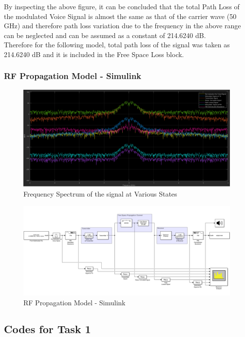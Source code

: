 \documentclass[a4paper,11pt]{article}%
\begin{document}
By inspecting the above figure, it can be concluded that the total Path Loss of the modulated Voice Signal is almost the same as that of the carrier wave (50 GHz) and therefore path loss variation due to the frequency in the above range can be neglected and can be assumed as a constant of 214.6240 dB.\\
Therefore for the following model, total path loss of the signal was taken as 214.6240 dB and it is included in the Free Space Loss block.

\subsubsection{RF Propagation Model - Simulink}

\begin{figure}[!h]
	\centering
	\includegraphics[scale = 0.42]{figures/spect2}
	\caption{Frequency Spectrum of the signal at Various States}
\end{figure}

\begin{figure}[!h]
	\centering
	\includegraphics[scale = 0.64, angle= 90]{figures/model}
	\caption{RF Propagation Model - Simulink}
\end{figure}


\pagebreak
\subsection{Codes for Task 1}

\end{document}
